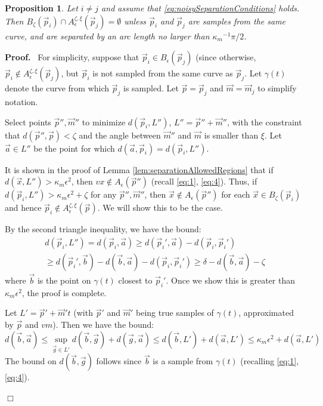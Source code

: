 \documentclass{article}
\newcommand{\nin}{\not\in}
\newtheorem{proposition}[cntr]{Proposition}
\newenvironment{proof}{
  \noindent\textbf{Proof.}\ }{\hspace*{\fill}
  \begin{math}\Box\end{math}\medskip}
\numberwithin{cntr}{section}
\numberwithin{equation}{section}
\newcommand{\vx}[0]{{\vec{x}}}
\newcommand{\vp}[0]{{\vec{p}}}
\newcommand{\vm}[0]{{\vec{m}}}
\newcommand{\va}[0]{{\vec{a}}}
\newcommand{\vb}[0]{{\vec{b}}}
\newcommand{\vg}[0]{{\vec{g}}}
\newcommand{\ball}[2]{ { B_{#1}(#2) } }
\newcommand{\allowed}[2]{ { A_{#1}(#2) } }
\newcommand{\curvemax}{{\kappa_{m}}}
\newcommand{\curvemaxi}{{\curvemax^{-1}}}
\newcommand{\curvesep}{{\delta}}
\newcommand{\pointNoise}{{\zeta}}
\newcommand{\tanNoise}{{\xi}}
\newcommand{\nallowed}[2]{ { A^{\pointNoise, \tanNoise}_{#1}(#2) } }
\begin{document}
\begin{proposition}
  Let $i \neq j$ and assume that \eqref{eq:noisySeparationConditions} holds. Then $\ball{\pointNoise}{\vp_{i}} \cap \nallowed{\epsilon}{\vp_{j}} = \emptyset$ unless $\vp_{i}$ and $\vp_{j}$ are samples from the same curve, and are separated by an arc length no larger than $\curvemaxi \pi/2$.
\end{proposition}

\begin{proof}
  For simplicity, suppose that $\vp_{i} \in \ball{\epsilon}{\vp_{j}}$ (since otherwise, $\vp_{i} \nin \nallowed{\epsilon}{\vp_{j}}$, but $\vp_{i}$ is not sampled from the same curve as $\vp_{j}$. Let $\gamma(t)$ denote the curve from which $\vp_{j}$ is sampled. Let $\vp = \vp_{j}$ and $\vm = \vm_{j}$ to simplify notation.

  Select points $\vp'', \vm''$ to minimize $d(\vp_{i},L'')$, $L''=\vp''+\vm''$, with the constraint that $d(\vp'',\vp) < \pointNoise$ and the angle between $\vm''$ and $\vm$ is smaller than $\tanNoise$. Let $\va \in L''$ be the point for which $d(\va,\vp_{i}) = d(\vp_{i},L'')$.

  It is shown in the proof of Lemma \ref{lem:separationAllowedRegions} that if $d(\vx, L'') > \curvemax \epsilon^{2}$, then $vx \nin \allowed{\epsilon}{\vp''}$ (recall \eqref{eq:1}, \eqref{eq:4}). Thus, if $d(\vp_{i},L'') > \curvemax \epsilon^{2} + \pointNoise$ for any $\vp'', \vm''$, then $\vx \nin \allowed{\epsilon}{\vp''}$ for each $\vx \in \ball{\pointNoise}{\vp_{i}}$ and hence $\vp_{i} \nin \nallowed{\epsilon}{\vp}$. We will show this to be the case.


  By the second triangle inequality, we have the bound:
  \begin{multline}
    \label{eq:7}
    d(\vp_{i},L'') = d(\vp_{i},\va) \geq d(\vp_{i}',\va) - d(\vp_{i}, \vp_{i}')\\
    \geq d(\vp_{i}', \vb) - d(\vb,\va) - d(\vp_{i}, \vp_{i}')
    \geq \curvesep - d(\vb,\va) - \pointNoise
  \end{multline}
  where $\vb$ is the point on $\gamma(t)$ closest to $\vp_{i}'$. Once we show this is greater than $\curvemax \epsilon^{2}$, the proof is complete.

Let $L'=\vp' + \vm' t$ (with $\vp'$ and $\vm'$ being true samples of $\gamma(t)$, approximated by $\vp$ and $vm$). Then we have the bound:
  \begin{equation}
    \label{eq:6}
    d(\vb,\va) \leq \sup_{\vg \in L'} d(\vb,\vg) + d(\vg, \va) \leq d(\vb,L') + d(\va,L') \leq \curvemax \epsilon^{2} + d(\va,L')
  \end{equation}
  The bound on $d(\vb, \vg)$ follows since $\vb$ is a sample from $\gamma(t)$ (recalling \eqref{eq:1}, \eqref{eq:4}).


\end{proof}
\end{document}
